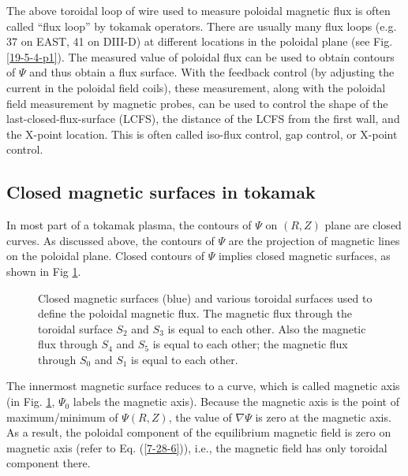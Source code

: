 \documentclass{llncs}
\begin{document}
The above toroidal loop of wire used to measure poloidal magnetic flux is
often called ``flux loop'' by tokamak operators. There are usually many flux
loops (e.g. 37 on EAST{\cite{xiao2007}}, 41 on DIII-D) at different locations
in the poloidal plane (see Fig. \ref{19-5-4-p1}). The measured value of
poloidal flux can be used to obtain contours of $\Psi$ and thus obtain a flux
surface. With the feedback control (by adjusting the current in the poloidal
field coils), these measurement, along with the poloidal field measurement by
magnetic probes, can be used to control the shape of the
last-closed-flux-surface (LCFS), the distance of the LCFS from the first wall,
and the X-point location. This is often called iso-flux control, gap control,
or X-point control.

\subsection{Closed magnetic surfaces in tokamak}

In most part of a tokamak plasma, the contours of $\Psi$ on $(R, Z)$ plane are
closed curves. As discussed above, the contours of $\Psi$ are the projection
of magnetic lines on the poloidal plane. Closed contours of $\Psi$ implies
closed magnetic surfaces, as shown in Fig \ref{7-1-p101}.

\begin{figure}[h]
  \caption{\label{7-1-p101}Closed magnetic surfaces (blue) and various
  toroidal surfaces used to define the poloidal magnetic flux. The magnetic
  flux through the toroidal surface $S_2$ and $S_3$ is equal to each other.
  Also the magnetic flux through $S_4$ and $S_5$ is equal to each other; the
  magnetic flux through $S_0$ and $S_1$ is equal to each other.}
\end{figure}

The innermost magnetic surface reduces to a curve, which is called magnetic
axis (in Fig. \ref{7-1-p101}, $\Psi_0$ labels the magnetic axis). Because the
magnetic axis is the point of maximum/minimum of $\Psi (R, Z)$, the value of
$\nabla \Psi$ is zero at the magnetic axis. As a result, the poloidal
component of the equilibrium magnetic field is zero on magnetic axis (refer to
Eq. (\ref{7-28-6})), i.e., the magnetic field has only toroidal component
there.
\end{document}
